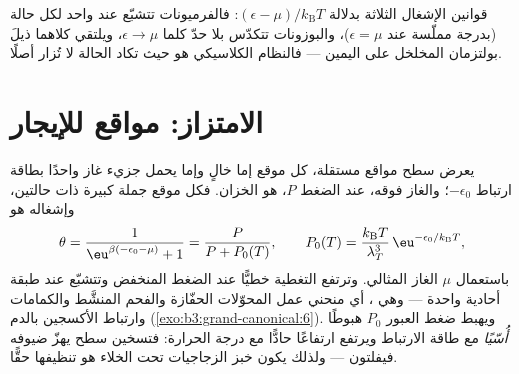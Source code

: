 \begin{omfigure}

{\small قوانين الإشغال الثلاثة بدلالة $(\epsilon -
\mu)/k_{\text{B}}T$: فالفرميونات تتشبّع عند واحد لكل حالة (بدرجة
مملّسة عند $\epsilon = \mu$)، والبوزونات تتكدّس بلا حدّ كلما
$\epsilon \to \mu$، ويلتقي كلاهما ذيلَ بولتزمان المخلخل على
اليمين --- فالنظام الكلاسيكي هو حيث تكاد الحالة لا تُزار
أصلًا.}
\end{omfigure}

\section{الامتزاز: مواقع للإيجار}

\begin{proposition}\label{prop:b3:grand-canonical:langmuir}
يعرض سطح مواقع مستقلة، كل موقع إما خالٍ وإما يحمل جزيء
غاز واحدًا بطاقة ارتباط $-\epsilon_0$؛ والغاز فوقه، عند
الضغط $P$، هو الخزان. فكل موقع جملة كبيرة ذات حالتين،
وإشغاله هو
\[
\theta = \frac{1}{\eu^{\beta(-\epsilon_0 - \mu)} + 1}
 = \frac{P}{P + P_0(T)} , \qquad
P_0(T) = \frac{k_{\text{B}}T}{\lambda_T^3}\,
\eu^{-\epsilon_0/k_{\text{B}}T} ,
\]
باستعمال $\mu$ الغاز المثالي. وترتفع التغطية خطيًّا عند الضغط
المنخفض وتتشبّع عند طبقة أحادية واحدة --- وهي \emph{}، أي منحني عمل المحوّلات الحفّازة والفحم
المنشَّط والكمامات وارتباط الأكسجين بالدم
(\cref{exo:b3:grand-canonical:6}). ويهبط ضغط العبور $P_0$
هبوطًا \emph{أُسّيًا} مع طاقة الارتباط ويرتفع ارتفاعًا حادًّا
مع درجة الحرارة: فتسخين سطح يهزّ ضيوفه فيفلتون ---
ولذلك يكون خبز الزجاجيات تحت الخلاء هو تنظيفها حقًّا.
\end{proposition}

